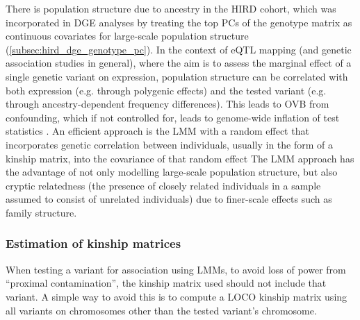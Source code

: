 There is population structure due to ancestry in the \gls{HIRD} cohort,
which was incorporated in \gls{DGE} analyses by treating the top \glspl{PC} of the genotype matrix as continuous covariates for large-scale population structure (\autoref{subsec:hird_dge_genotype_pc}).
In the context of \gls{eQTL} mapping (and genetic association studies in general), 
where the aim is to assess the marginal effect of a single genetic variant on expression, 
population structure can be correlated with both expression (e.g. through polygenic effects)
and the tested variant (e.g. through ancestry-dependent frequency differences).
This leads to \gls{OVB} from confounding, which if not controlled for, leads to genome-wide inflation of test statistics \autocite{price2010NewApproachesPopulation}.
%
An efficient approach is the \gls{LMM} with a random effect that incorporates genetic correlation between individuals, usually in the form of a kinship matrix, into the covariance of that random effect\autocite{price2010NewApproachesPopulation, eu-ahsunthornwattana2014ComparisonMethodsAccount, golan2018MixedModelsCaseControl}
The \gls{LMM} approach has the advantage of not only modelling large-scale population structure, but also cryptic relatedness (the presence of closely related individuals in a sample assumed to consist of unrelated individuals\autocite{astle2009PopulationStructureCryptic}) due to finer-scale effects such as family structure\autocite{golan2018MixedModelsCaseControl}.

\subsubsection{Estimation of kinship matrices}

%
When testing a variant for association using \glspl{LMM}, to avoid loss of power from \enquote{proximal contamination}, the kinship matrix used should not include that variant\autocite{listgarten2012ImprovedLinearMixed}.
A simple way to avoid this is to compute a \gls{LOCO} kinship matrix using all variants on chromosomes other than the tested variant's chromosome\autocite{lippert2011FaSTLinearMixed}.

